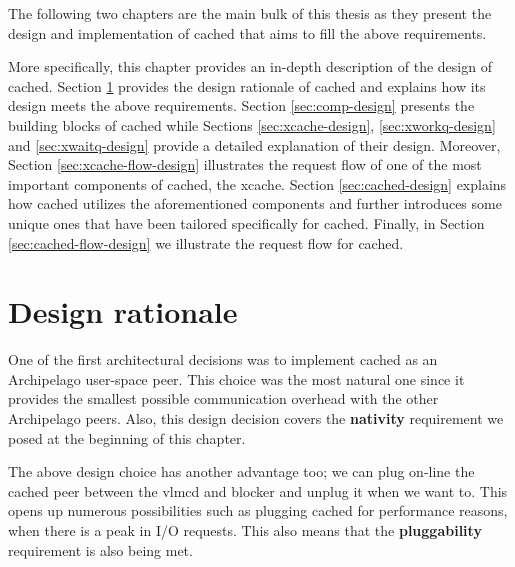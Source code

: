 The following two chapters are the main bulk of this thesis as they present the 
design and implementation of cached that aims to fill the above requirements.

More specifically, this chapter provides an in-depth description of the design 
of cached. Section \ref{sec:rationale-design} provides the design rationale of 
cached and explains how its design meets the above requirements. Section 
\ref{sec:comp-design} presents the building blocks of cached while Sections 
\ref{sec:xcache-design}, \ref{sec:xworkq-design} and \ref{sec:xwaitq-design} 
provide a detailed explanation of their design. Moreover, Section 
\ref{sec:xcache-flow-design} illustrates the request flow of one of the most 
important components of cached, the xcache. Section \ref{sec:cached-design} 
explains how cached utilizes the aforementioned components and further 
introduces some unique ones that have been tailored specifically for cached.  
Finally, in Section \ref{sec:cached-flow-design} we illustrate the request flow 
for cached.

\section{Design rationale}\label{sec:rationale-design}

One of the first architectural decisions was to implement cached as an 
Archipelago user-space peer.  This choice was the most natural one since it 
provides the smallest possible communication overhead with the other 
Archipelago peers. Also, this design decision covers the \textbf{nativity} 
requirement we posed at the beginning of this chapter.

The above design choice has another advantage too; we can plug on-line the 
cached peer between the vlmcd and blocker and unplug it when we want to. This 
opens up numerous possibilities such as plugging cached for performance 
reasons, when there is a peak in I/O requests.  This also means that the 
\textbf{pluggability} requirement is also being met.

\begin{comment}
This is possible because, as we have mentioned in Section \ref{sec:arch-ipc}, 
XSEG ports can be registered on-line. Thus, during normal operation, the 
administrator can add the cached port to the request path between vlmcd and 
blocker, and all requests will seamlessly be intercepted by cached. This 
follows the same principle with bcache, which plugs its own request\_fn() 
function to the virtual device it creates.  Unlike bcache however, cached can 
be plugged on and off at any time.
\end{comment}

